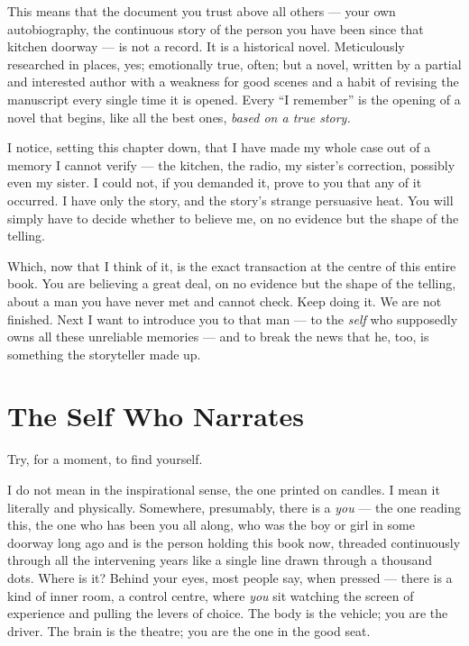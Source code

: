 This means that the document you trust above all others — your own autobiography, the continuous story of the person you have been since that kitchen doorway — is not a record. It is a historical novel. Meticulously researched in places, yes; emotionally true, often; but a novel, written by a partial and interested author with a weakness for good scenes and a habit of revising the manuscript every single time it is opened. Every ``I remember'' is the opening of a novel that begins, like all the best ones, \emph{based on a true story.}

I notice, setting this chapter down, that I have made my whole case out of a memory I cannot verify — the kitchen, the radio, my sister's correction, possibly even my sister. I could not, if you demanded it, prove to you that any of it occurred. I have only the story, and the story's strange persuasive heat. You will simply have to decide whether to believe me, on no evidence but the shape of the telling.

Which, now that I think of it, is the exact transaction at the centre of this entire book. You are believing a great deal, on no evidence but the shape of the telling, about a man you have never met and cannot check. Keep doing it. We are not finished. Next I want to introduce you to that man — to the \emph{self} who supposedly owns all these unreliable memories — and to break the news that he, too, is something the storyteller made up.

\chapter{The Self Who Narrates}

Try, for a moment, to find yourself.

I do not mean in the inspirational sense, the one printed on candles. I mean it literally and physically. Somewhere, presumably, there is a \emph{you} — the one reading this, the one who has been you all along, who was the boy or girl in some doorway long ago and is the person holding this book now, threaded continuously through all the intervening years like a single line drawn through a thousand dots. Where is it? Behind your eyes, most people say, when pressed — there is a kind of inner room, a control centre, where \emph{you} sit watching the screen of experience and pulling the levers of choice. The body is the vehicle; you are the driver. The brain is the theatre; you are the one in the good seat.

